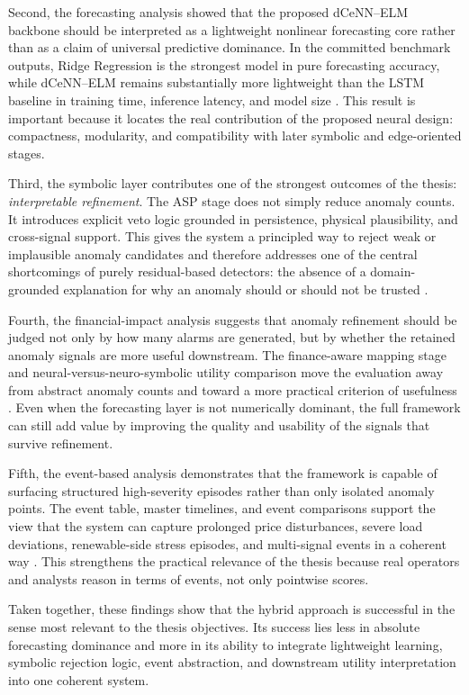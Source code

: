 Second, the forecasting analysis showed that the proposed dCeNN--ELM backbone should be interpreted as a lightweight nonlinear forecasting core rather than as a claim of universal predictive dominance. In the committed benchmark outputs, Ridge Regression is the strongest model in pure forecasting accuracy, while dCeNN--ELM remains substantially more lightweight than the LSTM baseline in training time, inference latency, and model size \cite{repo_thesis_grid_anomaly}. This result is important because it locates the real contribution of the proposed neural design: compactness, modularity, and compatibility with later symbolic and edge-oriented stages.

Third, the symbolic layer contributes one of the strongest outcomes of the thesis: \emph{interpretable refinement}. The ASP stage does not simply reduce anomaly counts. It introduces explicit veto logic grounded in persistence, physical plausibility, and cross-signal support. This gives the system a principled way to reject weak or implausible anomaly candidates and therefore addresses one of the central shortcomings of purely residual-based detectors: the absence of a domain-grounded explanation for why an anomaly should or should not be trusted \cite{repo_thesis_grid_anomaly}.

Fourth, the financial-impact analysis suggests that anomaly refinement should be judged not only by how many alarms are generated, but by whether the retained anomaly signals are more useful downstream. The finance-aware mapping stage and neural-versus-neuro-symbolic utility comparison move the evaluation away from abstract anomaly counts and toward a more practical criterion of usefulness \cite{repo_thesis_grid_anomaly}. Even when the forecasting layer is not numerically dominant, the full framework can still add value by improving the quality and usability of the signals that survive refinement.

Fifth, the event-based analysis demonstrates that the framework is capable of surfacing structured high-severity episodes rather than only isolated anomaly points. The event table, master timelines, and event comparisons support the view that the system can capture prolonged price disturbances, severe load deviations, renewable-side stress episodes, and multi-signal events in a coherent way \cite{repo_thesis_grid_anomaly}. This strengthens the practical relevance of the thesis because real operators and analysts reason in terms of events, not only pointwise scores.

Taken together, these findings show that the hybrid approach is successful in the sense most relevant to the thesis objectives. Its success lies less in absolute forecasting dominance and more in its ability to integrate lightweight learning, symbolic rejection logic, event abstraction, and downstream utility interpretation into one coherent system.

